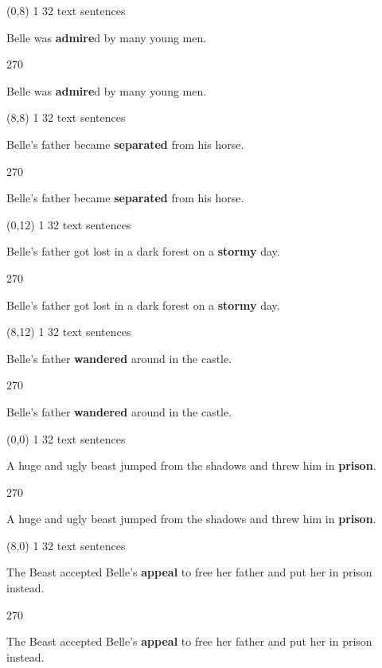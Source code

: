 \documentclass[a4paper]{article}
\newenvironment{itemize*}%
{\begin{itemize}%
 \setlength{\itemsep}{0.5cm}%
 \setlength{\parsep}{0pt}%
 \setlength{\parskip}{0pt}}%
{\end{itemize}}
\newcommand{\mycard}[3]{%
	\small #1 #2
	\par
	\parbox[t][6.8cm][c]{9.5cm}{%
	\par
	\myleft{#3}
	\par
	\myright{#3}
	}
}
\newcommand{\myleft}[1]{%
	\begin{sideways}
	\hspace*{-0.9cm}
		\parbox[t][2.7cm][t]{6.5cm}{%
		\large #1
		}
	\end{sideways}
}
\newcommand{\myright}[1]{%
	\hspace*{6.5cm}
	\begin{turn}{270}
	\hspace*{-7.1cm}
		\parbox[t][2.7cm][t]{6.5cm}{%
		\large #1
		}
	\end{turn}
}
\begin{document}
\begin{textblock}{8}(0,8)
\mycard{1}{32 text sentences}{
\begin{itemize*}
\item Belle was \textbf{admire}d by many young men.
\end{itemize*}
}
\end{textblock}

\begin{textblock}{8}(8,8)
\mycard{1}{32 text sentences}{
\begin{itemize*}
\item Belle's father became \textbf{separated} from his horse.
\end{itemize*}
}
\end{textblock}

\begin{textblock}{8}(0,12)
\mycard{1}{32 text sentences}{
\begin{itemize*}
\item Belle's father got lost in a dark forest on a \textbf{stormy} day.
\end{itemize*}
}
\end{textblock}

\begin{textblock}{8}(8,12)
\mycard{1}{32 text sentences}{
\begin{itemize*}
\item Belle's father \textbf{wandered} around in the castle.
\end{itemize*}
}
\end{textblock}

\null
\newpage

\begin{textblock}{8}(0,0)
\mycard{1}{32 text sentences}{
\begin{itemize*}
\item A huge and ugly beast jumped from the shadows and threw him in \textbf{prison}.
\end{itemize*}
}
\end{textblock}

\begin{textblock}{8}(8,0)
\mycard{1}{32 text sentences}{
\begin{itemize*}
\item The Beast accepted Belle's \textbf{appeal} to free her father and put her in prison instead.
\end{itemize*}
}
\end{textblock}
\end{document}
